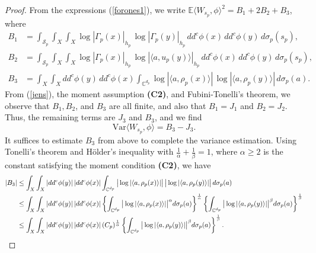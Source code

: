 \documentclass[11pt,leqno,oneside]{amsart}
\numberwithin{equation}{section}
\begin{document}
\begin{proof}
 From the expressions (\ref{forones1}), we write \( \mathbb{E}\langle W_{s_{p}}, \phi \rangle^{2} = B_{1} + 2B_{2} + B_{3} \), where
 \begin{align}
 	B_{1} &= \int_{\mathcal{S}_{p}} \int_{X} \int_{X}{\log{| \Gamma_{p}(x)|_{h_{p}}} \, \log{| \Gamma_{p}(y)|_{h_{p}}} \, dd^{c}\phi(x) \, dd^{c}\phi(y) \, d\sigma_{p}(s_{p})}, \label{B1} \\
 	B_{2} &= \int_{\mathcal{S}_{p}} \int_{X} \int_{X}{\log{|\Gamma_{p}(x)|_{h_{p}}} \, \log{| \langle a, u_{p}(y)\rangle|_{h_{p}}} \, dd^{c}\phi(x) \, dd^{c}\phi(y) \, d\sigma_{p}(s_{p})}, \label{B2} \\
 	B_{3} &= \int_{X} \int_{X}{dd^{c}\phi(y) \, dd^{c}\phi(x)} \int_{\mathbb{C}^{d_{p}}}{\log{|\langle a, \rho_{p}(x) \rangle|} \, \log{|\langle a, \rho_{p}(y) \rangle|} \, d\sigma_{p}(a)}. \label{B3}
 \end{align}
 From (\ref{jens}), the moment assumption \textbf{(C2)}, and Fubini-Tonelli’s theorem, we observe that \( B_{1}, B_{2} \), and \( B_{3} \) are all finite, and also that \( B_{1} = J_{1} \) and \( B_{2} = J_{2} \). Thus, the remaining terms are \( J_{3} \) and \( B_{3} \), and we find
 \begin{equation}\label{varip}
 	\mathrm{Var}\langle W_{s_{p}}, \phi \rangle = B_{3} - J_{3}.
 \end{equation}
 It suffices to estimate \( B_{3} \) from above to complete the variance estimation. Using Tonelli's theorem and H\"{o}lder's inequality with \( \frac{1}{\alpha} + \frac{1}{\beta} = 1 \), where \( \alpha \geq 2 \) is the constant satisfying the moment condition \textbf{(C2)}, we have
  \begin{align}
 	|B_{3}| &\leq \int_{X} \int_{X}{|dd^{c}\phi(y)| \, |dd^{c}\phi(x)|} \int_{\mathbb{C}^{d_{p}}}{\big| \log{|\langle a, \rho_{p}(x) \rangle|} \big| \, \big| \log{|\langle a, \rho_{p}(y) \rangle|} \big| \, d\sigma_{p}(a)} \notag \\
 	&\leq \int_{X} \int_{X}{|dd^{c}\phi(y)| \, |dd^{c}\phi(x)|} \left\{ \int_{\mathbb{C}^{d_{p}}}{\big| \log{|\langle a, \rho_{p}(x) \rangle|} \big|^{\alpha} d\sigma_{p}(a)} \right\}^{\frac{1}{\alpha}} \notag  \left\{ \int_{\mathbb{C}^{d_{p}}}{\big| \log{|\langle a, \rho_{p}(y) \rangle|} \big|^{\beta} d\sigma_{p}(a)} \right\}^{\frac{1}{\beta}} \notag \\
 	&\leq \int_{X} \int_{X}{|dd^{c}\phi(y)| \, |dd^{c}\phi(x)| \, (C_{p})^{\frac{1}{\alpha}}} \left\{ \int_{\mathbb{C}^{d_{p}}}{\big| \log{|\langle a, \rho_{p}(y) \rangle|} \big|^{\beta} d\sigma_{p}(a)} \right\}^{\frac{1}{\beta}}. \notag

\end{align}
\end{proof}
\end{document}
